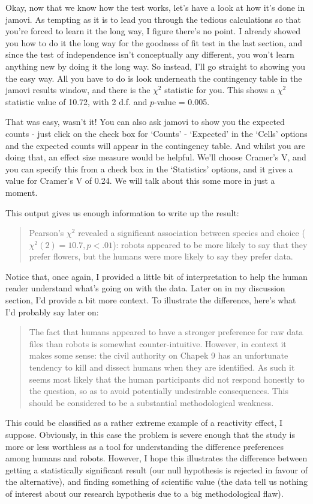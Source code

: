 

Okay, now that we know how the test works, let's have a look at how it's done in jamovi. As tempting as it is to lead you through the tedious calculations so that you're forced to learn it the long way, I figure there's no point. I already showed you how to do it the long way for the goodness of fit test in the last section, and since the test of independence isn't conceptually any different, you won't learn anything new by doing it the long way. So instead, I'll go straight to showing you the easy way. All you have to do is look underneath the contingency table in the jamovi results window, and there is the $\chi^2$ statistic for you. This shows a $\chi^2$ statistic value of 10.72, with 2 d.f. and $p$-value = 0.005. 

That was easy, wasn't it! You can also ask jamovi to show you the expected counts - just click on the check box for `Counts' - `Expected' in the `Cells' options and the expected counts will appear in the contingency table. And whilst you are doing that, an effect size measure would be helpful. We'll choose Cramer's V, and you can specify this from a check box in the `Statistics' options, and it gives a value for Cramer's V of 0.24. We will talk about this some more in just a moment.

This output gives us enough information to write up the result:
\begin{quote}
Pearson's $\chi^2$ revealed a significant association between species and choice ($\chi^2(2) = 10.7, p < .01$): robots appeared to be more likely to say that they prefer flowers, but the humans were more likely to say they prefer data.
\end{quote}
Notice that, once again, I provided a little bit of interpretation to help the human reader understand what's going on with the data. Later on in my discussion section, I'd provide a bit more context. To illustrate the difference, here's what I'd probably say later on:
\begin{quote}
The fact that humans appeared to have a stronger preference for raw data files than robots is somewhat counter-intuitive. However, in context it makes some sense: the civil authority on Chapek 9 has an unfortunate tendency to kill and dissect humans when they are identified. As such it seems most likely that the human participants did not respond honestly to the question, so as to avoid potentially undesirable consequences. This should be considered to be a substantial methodological weakness.
\end{quote}
This could be classified as a rather extreme example of a reactivity effect, I suppose. Obviously, in this case the problem is severe enough that the study is more or less worthless as a tool for understanding the difference preferences among humans and robots. However, I hope this illustrates the difference between getting a statistically significant result (our null hypothesis is rejected in favour of the alternative), and finding something of scientific value (the data tell us nothing of interest about our research hypothesis due to a big methodological flaw).


